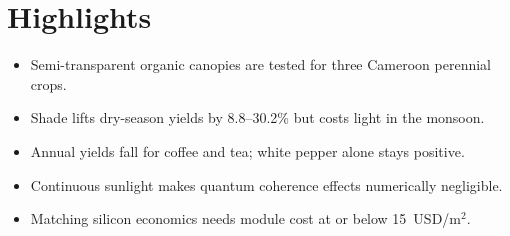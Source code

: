 \documentclass[12pt]{article}
\begin{document}
\section*{Highlights}
\begin{itemize}
  \item Semi-transparent organic canopies are tested for three Cameroon perennial crops.
  \item Shade lifts dry-season yields by 8.8--30.2\% but costs light in the monsoon.
  \item Annual yields fall for coffee and tea; white pepper alone stays positive.
  \item Continuous sunlight makes quantum coherence effects numerically negligible.
  \item Matching silicon economics needs module cost at or below 15~USD/m$^2$.
\end{itemize}
\end{document}

